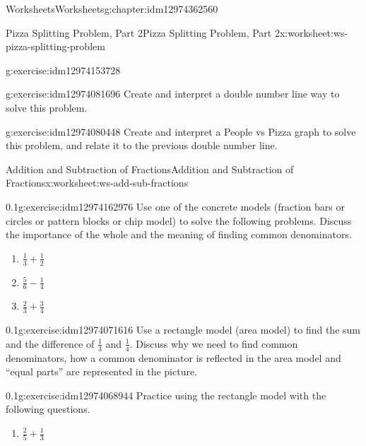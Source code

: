 \documentclass[twoside,11pt,]{book}
\begin{document}
\begin{chapterptx}{Worksheets}{}{Worksheets}{}{}{g:chapter:idm12974362560}
\begin{worksheet-section-numberless}{Pizza Splitting Problem, Part 2}{}{Pizza Splitting Problem, Part 2}{}{}{x:worksheet:ws-pizza-splitting-problem}
\begin{divisionexercise}{4}{}{}{g:exercise:idm12974153728}
\end{divisionexercise}%
\begin{divisionexercise}{5}{}{}{g:exercise:idm12974081696}%
Create and interpret a double number line way to solve this problem.%
\end{divisionexercise}%
\begin{divisionexercise}{6}{}{}{g:exercise:idm12974080448}%
Create and interpret a People vs Pizza graph to solve this problem, and relate it to the previous double number line.%
\end{divisionexercise}%
\end{worksheet-section-numberless}
\restoregeometry
%
%
\typeout{************************************************}
\typeout{************************************************}
%
\begin{worksheet-section-numberless}{Addition and Subtraction of Fractions}{}{Addition and Subtraction of Fractions}{}{}{x:worksheet:ws-add-sub-fractions}
\begin{divisionexercise}{1}{}{0.1}{g:exercise:idm12974162976}%
Use one of the concrete models (fraction bars or circles or pattern blocks or chip model) to solve the following problems. Discuss the importance of the whole and the meaning of finding common denominators.%
%
\begin{enumerate}[label=(\alph*)]
\item{}\(\frac{1}{3} + \frac{1}{2} \)%
\item{}\(\frac{5}{6} - \frac{1}{4} \)%
\item{}\(\frac{2}{3} + \frac{3}{4} \)%
\end{enumerate}
\end{divisionexercise}%
\begin{divisionexercise}{2}{}{0.1}{g:exercise:idm12974071616}%
Use a rectangle model (area model) to find the sum and the difference of \(\frac{1}{3} \) and \(\frac{1}{4} \).  Discuss why we need to find common denominators, how a common denominator is reflected in the area model and “equal parts” are represented in the picture.%
\end{divisionexercise}%
\clearpage
\begin{divisionexercise}{3}{}{0.1}{g:exercise:idm12974068944}%
Practice using the rectangle model with the following questions.%
%
\begin{enumerate}[label=(\alph*)]
\item{}\(\frac{2}{5} + \frac{1}{3} \)%

\end{enumerate}
\end{divisionexercise}
\end{worksheet-section-numberless}
\end{chapterptx}
\end{document}
